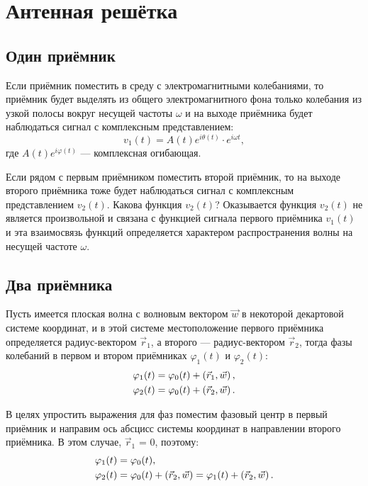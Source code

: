 \chapter{Антенная решётка}


\section{Один приёмник}

Если приёмник поместить в среду с электромагнитными колебаниями, то приёмник будет выделять из общего электромагнитного фона только колебания из узкой полосы вокруг
несущей частоты $\omega$ и на выходе приёмника будет наблюдаться сигнал с комплексным представлением:
\[
    v_1(t) = A(t) e^{i \theta(t)} \cdot e^{i \omega t} ,
\]
где $A(t) e^{i \varphi(t)}$ --- комплексная огибающая.

Если рядом с первым приёмником поместить второй приёмник, то на выходе второго приёмника тоже будет наблюдаться сигнал с комплексным представлением $v_2(t)$.
Какова функция $v_2(t)$? Оказывается функция $v_2(t)$ не является произвольной и связана с функцией сигнала первого приёмника $v_1(t)$ и эта взаимосвязь
функций определяется характером распространения волны на несущей частоте $\omega$.


\section{Два приёмника}

Пусть имеется плоская волна с волновым вектором $\vec{w}$ в некоторой декартовой системе координат, и в этой системе местоположение первого приёмника определяется
радиус-вектором $\vec{r}_1$, а второго --- радиус-вектором $\vec{r}_2$, тогда фазы колебаний в первом и втором приёмниках $\varphi_1(t)$ и $\varphi_2(t)$:
\begin{align*}
    \varphi_1(t) & = \varphi_0(t) + \left ( \vec{r}_1, \vec{w} \right ) , \\
    \varphi_2(t) & = \varphi_0(t) + \left ( \vec{r}_2, \vec{w} \right ) .
\end{align*}

В целях упростить выражения для фаз поместим фазовый центр в первый приёмник и направим ось абсцисс системы координат в направлении второго приёмника. В этом случае,
$\vec{r}_1$ = 0, поэтому:
\begin{align*}
    \varphi_1(t) & = \varphi_0(t) , \\
    \varphi_2(t) & = \varphi_0(t) + \left ( \vec{r}_2, \vec{w} \right ) = \varphi_1(t) + \left ( \vec{r}_2, \vec{w} \right ) .
\end{align*}


